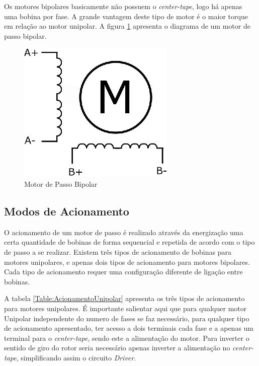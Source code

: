 Os motores bipolares basicamente não possuem o \emph{center-tape}, logo há apenas uma bobina por fase. A grande vantagem deste tipo de motor é o maior torque em relação ao motor unipolar. A figura \ref{fig:MotorDePassoBipolar} apresenta o diagrama de um motor de passo bipolar.

\begin{figure}[H]
	\centering
	\includegraphics[width = 0.3\columnwidth]{images/MotorDePassoBipolar.eps}
	\caption{Motor de Passo Bipolar}
	\label{fig:MotorDePassoBipolar}
\end{figure}


\subsection{Modos de Acionamento} 

O acionamento de um motor de passo é realizado através da energização uma certa quantidade de bobinas de forma sequencial e repetida de acordo com o tipo de passo a se realizar. Existem três tipos de acionamento de bobinas para motores unipolares, e apenas dois tipos de acionamento para motores bipolares. Cada tipo de acionamento requer uma configuração diferente de ligação entre bobinas.

A tabela \ref{Table:AcionamentoUnipolar} apresenta os três tipos de acionamento para motores unipolares. É importante salientar aqui que  para qualquer motor Unipolar independente do numero de fases se faz necessário, para qualquer tipo de acionamento apresentado, ter acesso a dois terminais cada fase e a apenas um terminal para o \emph{center-tape}, sendo este a alimentação do motor. Para inverter o sentido de giro do rotor seria necessário apenas inverter a alimentação no \emph{center-tape}, simplificando assim o circuito \emph{Driver}. 


